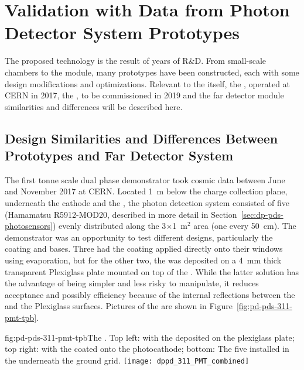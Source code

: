 \section{Validation with Data from Photon Detector System Prototypes}
\label{sec:dp-pds-prototypes}

The    proposed technology is the result of years of R\&D. From small-scale chambers to the  module, many prototypes have been constructed, each with some design modifications and optimizations. 
Relevant to the  itself, the , operated at CERN in 2017, the , to be commissioned in 2019 and the  far detector module similarities and differences will be described here.

\subsection{Design Similarities and Differences Between Prototypes and Far Detector System}

The first tonne scale dual phase   demonstrator took cosmic data between June and November \num{2017} at CERN. 
Located \SI{1}{m} below the charge collection plane, underneath the cathode and the , the photon detection system consisted of five  (Hamamatsu R5912-MOD20, described in more detail in Section~\ref{sec:dp-pds-photosensors}) evenly distributed along the 3$\times$1~m$^2$ area (one  every \SI{50}{cm}). The demonstrator was an opportunity to test different  designs, particularly the  coating and  bases. Three  had the  coating applied directly onto their windows using evaporation, but for the other two, the  was deposited on a \SI{4}{\mm} thick transparent Plexiglass plate mounted on top of the . 
While the latter solution has the advantage of being simpler and less risky to manipulate, it reduces acceptance and possibly efficiency because of the internal reflections between the  and the Plexiglass surfaces. 
Pictures of the   are shown in Figure~\ref{fig:pd-pds-311-pmt-tpb}.

\begin{dunefigure}{fig:pd-pds-311-pmt-tpb}{The  . Top left:  with the  deposited on the plexiglass plate; top right:  with the  coated onto the photocathode; bottom: The five  installed in the  underneath the ground grid.}
\texttt{[image: dppd\_311\_PMT\_combined]}
\end{dunefigure}

